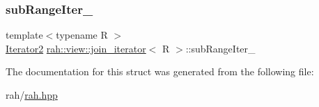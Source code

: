 \mbox{\label{structrah_1_1view_1_1join__iterator_a49b089a83af39b5f6893f57ad4a1d81c}} 
\subsubsection{\texorpdfstring{subRangeIter\_}{subRangeIter\_}}
{\footnotesize\ttfamily template$<$typename R $>$ \\
\mbox{\hyperlink{structrah_1_1view_1_1join__iterator_ae03a066174f3422c70d0e3c22e68d9f7}{Iterator2}} \mbox{\hyperlink{structrah_1_1view_1_1join__iterator}{rah\+::view\+::join\+\_\+iterator}}$<$ R $>$\+::sub\+Range\+Iter\+\_\+}



The documentation for this struct was generated from the following file\+:\begin{DoxyCompactItemize}
\item 
rah/\mbox{\hyperlink{rah_8hpp}{rah.\+hpp}}\end{DoxyCompactItemize}
